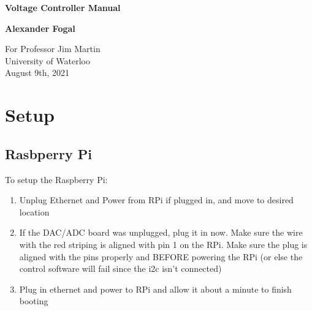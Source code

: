 \documentclass[11pt, letterpaper]{article}
\begin{document}
\begin{titlepage}
    \begin{center}
        \vspace*{1cm}

        \Huge
        \textbf{Voltage Controller Manual}

        \vspace{0.5cm}
        \LARGE

        \vspace{1.5cm}

        \textbf{Alexander Fogal}

        \vspace{7.8cm}

        \Large
        For Professor Jim Martin\\
        University of Waterloo\\
        August 9th, 2021

    \end{center}
\end{titlepage}

\tableofcontents

\newpage

\section{Setup}
\subsection{Rasbperry Pi}
To setup the Raspberry Pi:

\begin{enumerate}
    \item Unplug Ethernet and Power from RPi if plugged in, and move to desired location
    \item If the DAC/ADC board was unplugged, plug it in now. Make sure the wire with the red striping is aligned with pin 1 on the RPi. Make sure the plug is aligned with the pins properly and BEFORE powering the RPi (or else the control software will fail since the i2c isn't connected)
    \item Plug in ethernet and power to RPi and allow it about a minute to finish booting
\end{enumerate}
\end{document}
